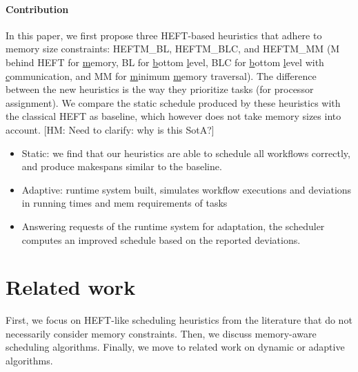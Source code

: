 \documentclass[conference]{IEEEtran}
\newcommand{\algo}[1]{\textsc{#1}}
\newcommand{\heftmm}{\algo{HEFTM\_MM}\xspace}
\newcommand{\heftbl}{\algo{HEFTM\_BL}\xspace}
\newcommand{\heftblc}{\algo{HEFTM\_BLC}\xspace}
\newcommand{\skug}[1]{{\color{blue}[SK: #1]}}
\newcommand{\hmey}[1]{{\color{red}[HM: #1]}}
\begin{document}
    \paragraph*{Contribution} In this paper, we first propose three HEFT-based heuristics
    that adhere to memory size constraints: \heftbl, \heftblc, and \heftmm
    (M behind HEFT for \underline{m}emory, BL for \underline{b}ottom \underline{l}evel,
    BLC for \underline{b}ottom \underline{l}evel with \underline{c}ommunication, 
    and MM for \underline{m}inimum \underline{m}emory traversal).
    The difference between the new heuristics is the way they prioritize tasks (for processor assignment).
    We compare the static schedule produced by these heuristics with the classical HEFT as
    baseline, which however does not take memory sizes into account. 
    \hmey{Need to clarify: why is this SotA?}
    
    \begin{itemize}
      \item Static: we find that our heuristics are able to schedule all workflows correctly, and produce makespans similar to the baseline.
      \item Adaptive: runtime system built, simulates workflow executions and deviations in running times and mem requirements of tasks
      \item Answering requests of the runtime system for adaptation, the scheduler computes an improved schedule based on the reported deviations.
    \end{itemize}







    \section{Related work} %
    \label{sec:related-work}
   
   First, we focus on HEFT-like scheduling heuristics from the literature  that do not necessarily  
   consider memory constraints. Then, we discuss memory-aware scheduling algorithms. 
   Finally, we move to related work on dynamic or adaptive algorithms. 
\end{document}
